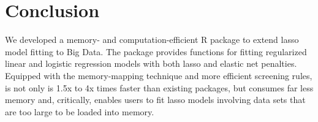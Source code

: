 %
%

\section{Conclusion}

We developed a memory- and computation-efficient R package  to extend lasso model fitting to Big Data.
The package provides functions for fitting regularized linear and logistic regression models with both lasso and elastic net penalties.
Equipped with the memory-mapping technique and more efficient screening rules,  is not only is 1.5x to 4x times faster than existing packages, but consumes far less memory and, critically, enables users to fit lasso models involving data sets that are too large to be loaded into memory.




